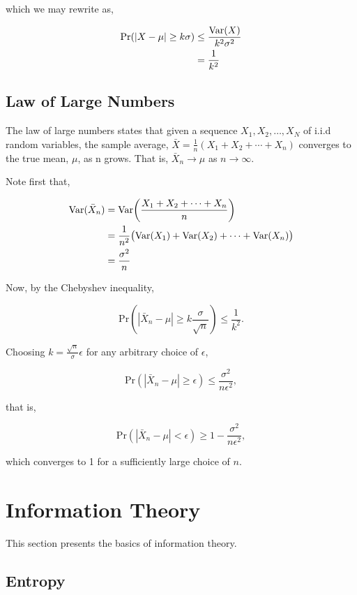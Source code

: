 \documentclass[11pt]{amsart}
\begin{document}
which we may rewrite as,

\begin{align}
\text{Pr}(|X - \mu| \geq k\sigma) &\leq \frac{\text{Var}(X)}{k^2\sigma^2} \notag \\
&= \frac{1}{k^2} \notag
\end{align}

\subsection{Law of Large Numbers}

The law of large numbers states that given a sequence $X_1, X_2, \dots, X_N$ of i.i.d random variables, the sample average, $\bar{X} = \frac{1}{n}(X_1 + X_2 + \cdots + X_n)$ converges to the true mean, $\mu$, as n grows. That is, $\bar{X}_n \rightarrow \mu$ as $n \rightarrow \infty$.

Note first that,

\begin{align}
\text{Var}(\bar{X}_n) &= \text{Var}\bigg(\frac{X_1 + X_2 + \cdots + X_n}{n}\bigg) \notag \\
&= \frac{1}{n^2}\big(\text{Var}(X_1) + \text{Var}(X_2) + \cdots + \text{Var}(X_n)\big) \notag \\
&= \frac{\sigma^2}{n} \notag
\end{align}

Now, by the Chebyshev inequality,

$$
\text{Pr}(|\bar{X}_n - \mu| \geq k\frac{\sigma}{\sqrt{n}}) \leq \frac{1}{k^2}.
$$

Choosing $k = \frac{\sqrt{n}}{\sigma}\epsilon$ for any arbitrary choice of $\epsilon$,

$$
\text{Pr}(|\bar{X}_n - \mu| \geq \epsilon) \leq \frac{\sigma^2}{n\epsilon^2},
$$

that is,

$$
\text{Pr}(|\bar{X}_n - \mu| < \epsilon) \geq 1 - \frac{\sigma^2}{n\epsilon^2},
$$

which converges to 1 for a sufficiently large choice of $n$.

\section{Information Theory}

This section presents the basics of information theory.

\subsection{Entropy}
\end{document}
